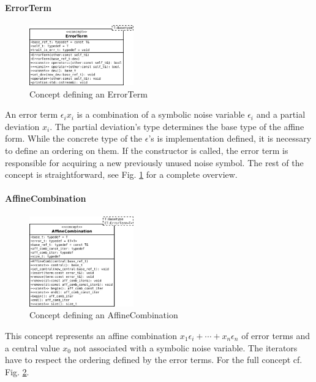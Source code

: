 \documentclass[a4]{scrartcl}
\begin{document}
\paragraph{ErrorTerm}
\label{sec:errorterm}
\begin{figure}[h]
  \centering
  \includegraphics[width=0.4\textwidth]{errorterm}
  \caption{Concept defining an ErrorTerm}
  \label{fig:error_term}
\end{figure}
An error term $\epsilon_i x_i$ is a combination of a symbolic noise variable
$\epsilon_i$ and a partial deviation $x_i$. The partial deviation's type
determines the base type of the affine form. While the concrete type of the
$\epsilon$'s is implementation defined, it is necessary to define an ordering
on them. If the constructor is called, the error term is responsible for
acquiring a new previously unused noise symbol.  The rest of the concept is
straightforward, see Fig. \ref{fig:error_term} for a complete overview. 

\paragraph{AffineCombination}
\label{sec:affinecombination}
\begin{figure}[h]
  \centering
  \includegraphics[width=0.4\textwidth]{affinecombination}
  \caption{Concept defining an AffineCombination}
  \label{fig:affine_comb}
\end{figure}
This concept represents an affine combination $x_1\epsilon_i + \cdots +
x_n\epsilon_n$ of error terms and a central value $x_0$ not associated with a
symbolic noise variable. The iterators have to respect the ordering defined by
the error terms. For the full concept cf. Fig. \ref{fig:affine_comb}. 
\end{document}
